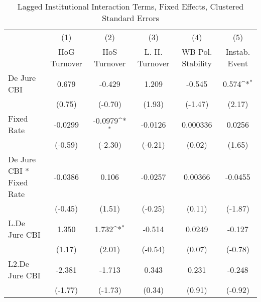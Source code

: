 \begin{table}[htbp]\centering
\def\sym#1{\ifmmode^{#1}\else\(^{#1}\)\fi}
\caption{Lagged Institutional Interaction Terms, Fixed Effects, Clustered Standard Errors \label{intlagsDJ}}
\begin{tabular}{l*{5}{c}}
\toprule
                                        &\multicolumn{1}{c}{(1)}&\multicolumn{1}{c}{(2)}&\multicolumn{1}{c}{(3)}&\multicolumn{1}{c}{(4)}&\multicolumn{1}{c}{(5)}\\
                                        &\multicolumn{1}{c}{HoG Turnover}&\multicolumn{1}{c}{HoS Turnover}&\multicolumn{1}{c}{L. H. Turnover}&\multicolumn{1}{c}{WB Pol. Stability}&\multicolumn{1}{c}{Instab. Event}\\
\midrule
De Jure CBI                             &    0.679         &   -0.429         &    1.209         &   -0.545         &    0.574\sym{*}  \\
                                        &   (0.75)         &  (-0.70)         &   (1.93)         &  (-1.47)         &   (2.17)         \\
\addlinespace
Fixed Rate                              &  -0.0299         &  -0.0979\sym{*}  &  -0.0126         & 0.000336         &   0.0256         \\
                                        &  (-0.59)         &  (-2.30)         &  (-0.21)         &   (0.02)         &   (1.65)         \\
\addlinespace
De Jure CBI * Fixed Rate                &  -0.0386         &    0.106         &  -0.0257         &  0.00366         &  -0.0455         \\
                                        &  (-0.45)         &   (1.51)         &  (-0.25)         &   (0.11)         &  (-1.87)         \\
\addlinespace
L.De Jure CBI                           &    1.350         &    1.732\sym{*}  &   -0.514         &   0.0249         &   -0.127         \\
                                        &   (1.17)         &   (2.01)         &  (-0.54)         &   (0.07)         &  (-0.78)         \\
\addlinespace
L2.De Jure CBI                          &   -2.381         &   -1.713         &    0.343         &    0.231         &   -0.248         \\
                                        &  (-1.77)         &  (-1.73)         &   (0.34)         &   (0.91)         &  (-0.92)         \\

\end{tabular}
\end{table}
